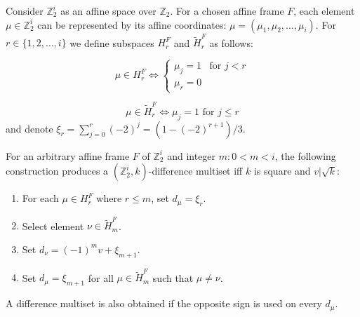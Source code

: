 Consider $\mathbb Z_2^i$ as an affine space over $\mathbb Z_2$. For a chosen affine frame $F$, each element $\mu\in\mathbb Z_2^i$ can be represented by its affine coordinates: $\mu=(\mu_1, \mu_2, \ldots, \mu_i)$. For $r\in\{1,2,\ldots,i\}$ we define subspaces $H_r^F$ and $\widetilde H_r^F$ as follows:

\begin{equation}
    \mu \in H_r^F \iff 
        \begin{cases}
            \mu_j = 1 & \text{for } j < r \\
            \mu_r = 0
        \end{cases}
\end{equation}

\begin{equation}
    \mu \in \widetilde H_r^F \iff 
        \mu_j = 1 \text{ for } j \leq r
\end{equation}
and denote $\xi_r = \sum\limits_{j=0}^r (-2)^j=(1-(-2)^{r+1})/3$.

\begin{theorem}
    \label{z2i:theorem:construction}
    For an arbitrary affine frame $F$ of $\mathbb Z_2^i$ and integer $m \colon 0 < m < i$, the following construction produces a $(\mathbb Z_2^i, k)$-difference multiset iff $k$ is square and $v | \sqrt k$:
    \begin{enumerate}
        \item For each $\mu \in H_r^F$ where $r \leq m$, set $d_\mu = \xi_r$.
        \item Select element $\nu \in \widetilde H_m^F$.
        \item Set $d_\nu = (-1)^m v + \xi_{m+1}$.
        \item Set $d_\mu = \xi_{m+1}$ for all $\mu \in \widetilde H_m^F$ such that $\mu \neq \nu$.
    \end{enumerate}
\end{theorem}

A difference multiset is also obtained if the opposite sign is used on every $d_\mu$.

